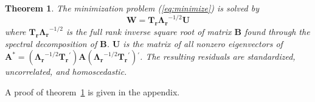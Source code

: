 \documentclass{article} %
\newtheorem{theorem}{Theorem}
\newcommand{\trans}{\ensuremath{^\prime}}
\newcommand{\var}{\ensuremath{\mathrm{Var}}}
\begin{document}
\begin{theorem}\label{thm1}
The minimization problem (\ref{eq:minimize}) is solved by
\[
\bm{W} = \bm{T_r \Lambda_r}^{-1/2} \bm{U} 
\]
where $\bm{T_r \Lambda_r}^{-1/2}$ is the full rank inverse square root of matrix $\bm{B}$ found through the spectral decomposition of $\bm{B}$. $\bm{U}$ is the matrix of all nonzero eigenvectors of $ \bm{A^*} = (\bm{\Lambda_r}^{-1/2} \bm{T_r}\trans) \bm{A} (\bm{\Lambda_r}^{-1/2} \bm{T_r}\trans)\trans$. The resulting residuals are standardized, uncorrelated, and homoscedastic.
%


\end{theorem}
A proof of theorem~\ref{thm1} is given in the appendix.
\end{document}
